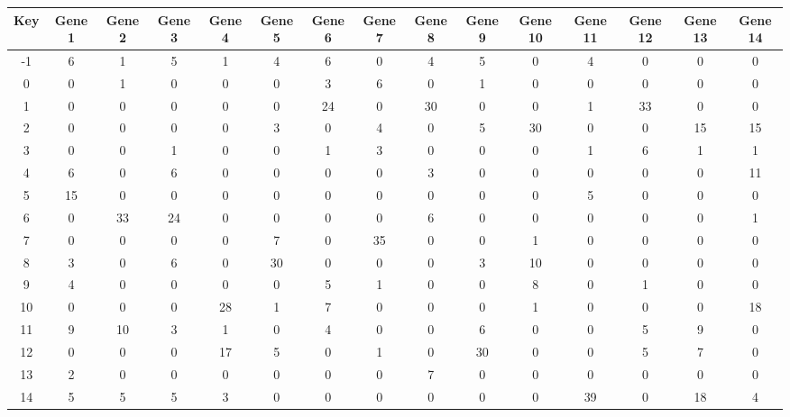 \begin{tabular}{|c|c|c|c|c|c|c|c|c|c|c|c|c|c|c|}
\hline
Key & Gene 1 & Gene 2 & Gene 3 & Gene 4 & Gene 5 & Gene 6 & Gene 7 & Gene 8 & Gene 9 & Gene 10 & Gene 11 & Gene 12 & Gene 13 & Gene 14 \\
\hline
-1 & 6 & 1 & 5 & 1 & 4 & 6 & 0 & 4 & 5 & 0 & 4 & 0 & 0 & 0 \\
0 & 0 & 1 & 0 & 0 & 0 & 3 & 6 & 0 & 1 & 0 & 0 & 0 & 0 & 0 \\
1 & 0 & 0 & 0 & 0 & 0 & 24 & 0 & 30 & 0 & 0 & 1 & 33 & 0 & 0 \\
2 & 0 & 0 & 0 & 0 & 3 & 0 & 4 & 0 & 5 & 30 & 0 & 0 & 15 & 15 \\
3 & 0 & 0 & 1 & 0 & 0 & 1 & 3 & 0 & 0 & 0 & 1 & 6 & 1 & 1 \\
4 & 6 & 0 & 6 & 0 & 0 & 0 & 0 & 3 & 0 & 0 & 0 & 0 & 0 & 11 \\
5 & 15 & 0 & 0 & 0 & 0 & 0 & 0 & 0 & 0 & 0 & 5 & 0 & 0 & 0 \\
6 & 0 & 33 & 24 & 0 & 0 & 0 & 0 & 6 & 0 & 0 & 0 & 0 & 0 & 1 \\
7 & 0 & 0 & 0 & 0 & 7 & 0 & 35 & 0 & 0 & 1 & 0 & 0 & 0 & 0 \\
8 & 3 & 0 & 6 & 0 & 30 & 0 & 0 & 0 & 3 & 10 & 0 & 0 & 0 & 0 \\
9 & 4 & 0 & 0 & 0 & 0 & 5 & 1 & 0 & 0 & 8 & 0 & 1 & 0 & 0 \\
10 & 0 & 0 & 0 & 28 & 1 & 7 & 0 & 0 & 0 & 1 & 0 & 0 & 0 & 18 \\
11 & 9 & 10 & 3 & 1 & 0 & 4 & 0 & 0 & 6 & 0 & 0 & 5 & 9 & 0 \\
12 & 0 & 0 & 0 & 17 & 5 & 0 & 1 & 0 & 30 & 0 & 0 & 5 & 7 & 0 \\
13 & 2 & 0 & 0 & 0 & 0 & 0 & 0 & 7 & 0 & 0 & 0 & 0 & 0 & 0 \\
14 & 5 & 5 & 5 & 3 & 0 & 0 & 0 & 0 & 0 & 0 & 39 & 0 & 18 & 4 \\
\hline
\end{tabular}
